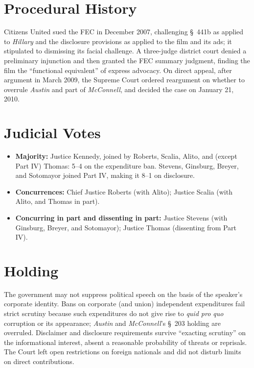 \documentclass[12pt]{article}
\begin{document}
\section{Procedural History}

Citizens United sued the FEC in December 2007, challenging \S~441b as applied to \textit{Hillary} and the disclosure provisions as applied to the film and its ads; it stipulated to dismissing its facial challenge. A three-judge district court denied a preliminary injunction and then granted the FEC summary judgment, finding the film the ``functional equivalent'' of express advocacy. On direct appeal, after argument in March 2009, the Supreme Court ordered reargument on whether to overrule \textit{Austin} and part of \textit{McConnell}, and decided the case on January 21, 2010.

\section{Judicial Votes}

\begin{itemize}
\item \textbf{Majority:} Justice Kennedy, joined by Roberts, Scalia, Alito, and (except Part IV) Thomas: 5--4 on the expenditure ban. Stevens, Ginsburg, Breyer, and Sotomayor joined Part IV, making it 8--1 on disclosure.
\item \textbf{Concurrences:} Chief Justice Roberts (with Alito); Justice Scalia (with Alito, and Thomas in part).
\item \textbf{Concurring in part and dissenting in part:} Justice Stevens (with Ginsburg, Breyer, and Sotomayor); Justice Thomas (dissenting from Part IV).
\end{itemize}

\section{Holding}

The government may not suppress political speech on the basis of the speaker's corporate identity. Bans on corporate (and union) independent expenditures fail strict scrutiny because such expenditures do not give rise to \textit{quid pro quo} corruption or its appearance; \textit{Austin} and \textit{McConnell}'s \S~203 holding are overruled. Disclaimer and disclosure requirements survive ``exacting scrutiny'' on the informational interest, absent a reasonable probability of threats or reprisals. The Court left open restrictions on foreign nationals and did not disturb limits on direct contributions.
\end{document}
